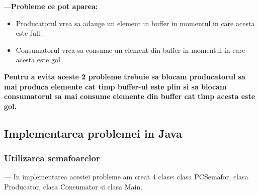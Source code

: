 \documentclass[14pt]{article}
\begin{document}
---\textbf{Probleme ce pot aparea:}

\begin{itemize}
\item Producatorul vrea sa adauge un element in buffer in momentul in care acesta este full.
\item Consumatorul vrea sa consume un element din buffer in momentul in care acesta este gol.
\end{itemize}

\textbf{Pentru a evita aceste 2 probleme trebuie sa blocam producatorul sa mai produca elemente cat timp buffer-ul este plin si sa blocam consumatorul sa mai consume elemente din buffer cat timp acesta este gol.}

\subsection{Implementarea problemei in Java}

\subsubsection{\textbf{Utilizarea semafoarelor}}

\vspace{2 mm}

--- In implementarea acestei probleme am creat 4 clase: clasa PCSemafor, clasa Producator, clasa Consumator si clasa Main.
\end{document}

